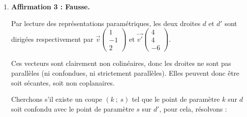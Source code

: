 \documentclass[10pt]{article}
\providecommand{\vect}[1]{\overrightarrow{#1}}
\begin{document}
\begin{enumerate}
	Ces vecteurs sont clairement non colinéaires, et donc O, A et B définissent bien un plan. Le repère est orthonormal, donc on peut calculer des produits scalaires à l'aide des coordonnées :

	On a bien :\quad $\vect{n} \cdot \vect{\mathrm{OA}} = 5 \times (-1) + (-2) \times 0 + 1 \times 5 = -5 + 0 + 5 = 0$ et $\vect{n}$ est donc bien orthogonal à $\vect{\mathrm{OA}}$,

	par contre, on a :\quad $\vect{n} \cdot \vect{\mathrm{OB}} = 5 \times 3 + (-2) \times 2 + 1 \times (-1) = 15 - 4 - 1 = 10 \neq 0$ et $\vect{n}$ n'est donc pas orthogonal à $\vect{\mathrm{OB}}$.

	Ainsi, $\vect{n}$ n'est pas orthogonal au plan (OAB), car il n'est pas orthogonal à deux vecteurs définissant une base de ce plan.

	\item \textbf{Affirmation 3 : Fausse.}

	Par lecture des représentations paramétriques, les deux droites $d$ et $d'$ sont dirigées respectivement par $\vect{v} \begin{pmatrix} 1 \\-1\\2\end{pmatrix}$ et  $\vect{v'} \begin{pmatrix} 4 \\4\\-6\end{pmatrix}$.

	Ces vecteurs sont clairement non colinéaires, donc les droites ne sont pas parallèles (ni confondues, ni strictement parallèles). Elles peuvent donc être soit sécantes, soit non coplanaires.

	Cherchons s'il existe un coupe $(k~;~s)$ tel que le point de paramètre $k$ sur $d$ soit confondu avec le point de paramètre $s$ sur $d'$, pour cela, résolvons :


\end{enumerate}
\end{document}
